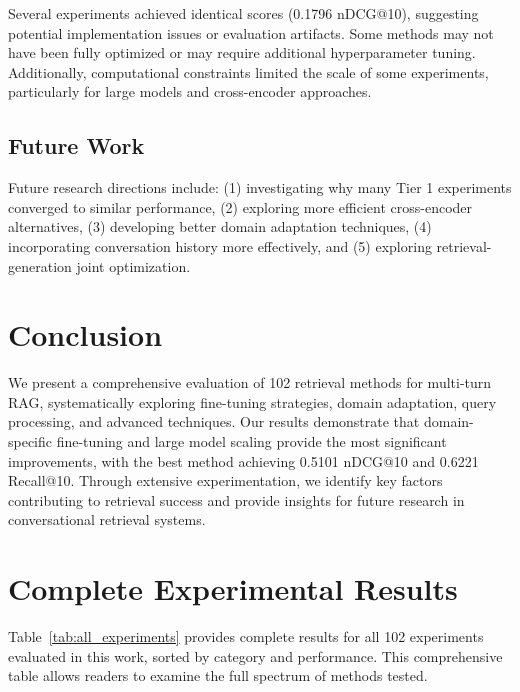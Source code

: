 \documentclass[11pt]{article}
\begin{document}
Several experiments achieved identical scores (0.1796 nDCG@10), suggesting potential implementation issues or evaluation artifacts. Some methods may not have been fully optimized or may require additional hyperparameter tuning. Additionally, computational constraints limited the scale of some experiments, particularly for large models and cross-encoder approaches.

\subsection{Future Work}

Future research directions include: (1) investigating why many Tier 1 experiments converged to similar performance, (2) exploring more efficient cross-encoder alternatives, (3) developing better domain adaptation techniques, (4) incorporating conversation history more effectively, and (5) exploring retrieval-generation joint optimization.

\section{Conclusion}

We present a comprehensive evaluation of 102 retrieval methods for multi-turn RAG, systematically exploring fine-tuning strategies, domain adaptation, query processing, and advanced techniques. Our results demonstrate that domain-specific fine-tuning and large model scaling provide the most significant improvements, with the best method achieving 0.5101 nDCG@10 and 0.6221 Recall@10. Through extensive experimentation, we identify key factors contributing to retrieval success and provide insights for future research in conversational retrieval systems.

\appendix
\section{Complete Experimental Results}

Table~\ref{tab:all_experiments} provides complete results for all 102 experiments evaluated in this work, sorted by category and performance. This comprehensive table allows readers to examine the full spectrum of methods tested.
\end{document}
